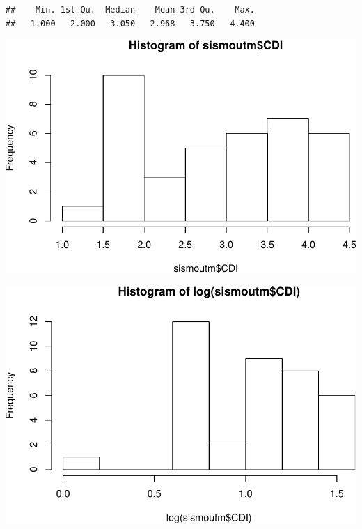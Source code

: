 \documentclass[11pt,]{article}
\newenvironment{Shaded}{\begin{snugshade}}{\end{snugshade}}
\newcommand{\KeywordTok}[1]{\textcolor[rgb]{0.13,0.29,0.53}{\textbf{#1}}}
\newcommand{\OperatorTok}[1]{\textcolor[rgb]{0.81,0.36,0.00}{\textbf{#1}}}
\newcommand{\NormalTok}[1]{#1}
\begin{document}
\begin{verbatim}
##    Min. 1st Qu.  Median    Mean 3rd Qu.    Max. 
##   1.000   2.000   3.050   2.968   3.750   4.400
\end{verbatim}

\begin{Shaded}
\end{Shaded}

\includegraphics{proyecto_files/figure-latex/unnamed-chunk-22-1.pdf}

\begin{Shaded}
\end{Shaded}

\includegraphics{proyecto_files/figure-latex/unnamed-chunk-22-2.pdf}
\end{document}
